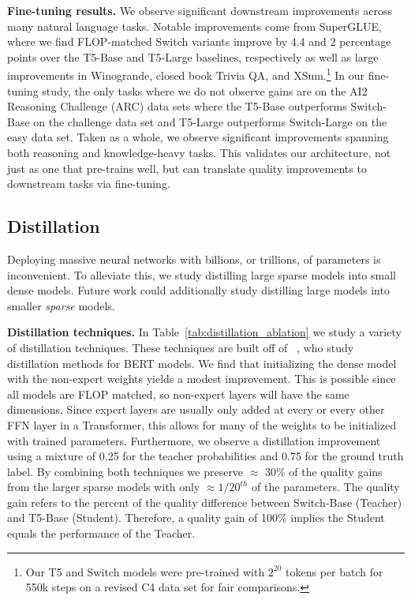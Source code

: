 \documentclass[twoside,11pt]{article}
\begin{document}
\textbf{Fine-tuning results.} We observe significant downstream improvements across many natural language tasks.
Notable improvements come from SuperGLUE, where we find FLOP-matched Switch variants improve by 4.4 and 2 percentage points over the T5-Base and T5-Large baselines, respectively as well as large improvements in Winogrande, closed book Trivia QA, and XSum.\footnote{Our T5 and Switch models were pre-trained with $2^{20}$ tokens per batch for 550k steps on a revised C4 data set for fair comparisons.}
In our fine-tuning study, the only tasks where we do not observe gains are on the AI2 Reasoning Challenge (ARC) data sets where the T5-Base outperforms Switch-Base on the challenge data set and T5-Large outperforms Switch-Large on the easy data set.
Taken as a whole, we observe significant improvements spanning both reasoning and knowledge-heavy tasks.
This validates our architecture, not just as one that pre-trains well, but can translate quality improvements to downstream tasks via fine-tuning.

\subsection{Distillation}
Deploying massive neural networks with billions, or trillions, of parameters is inconvenient.
To alleviate this, we study distilling \citep{hinton2015distilling} large sparse models into small dense models. 
Future work could additionally study distilling large models into smaller \emph{sparse} models.

\textbf{Distillation techniques.}
In Table~\ref{tab:distillation_ablation} we study a variety of distillation techniques.
These techniques are built off of ~\cite{sanh2019distilbert}, who study distillation methods for BERT models.
We find that initializing the dense model with the non-expert weights yields a modest improvement. 
This is possible since all models are FLOP matched, so non-expert layers will have the same dimensions.
Since expert layers are usually only added at every or every other FFN layer in a Transformer, this allows for many of the weights to be initialized with trained parameters.
Furthermore, we observe a distillation improvement using a mixture of 0.25 for the teacher probabilities and 0.75 for the ground truth label.
By combining both techniques we preserve $\approx$ 30\% of the quality gains from the larger sparse models with only $\approx1/20^{th}$ of the parameters. 
The quality gain refers to the percent of the quality difference between Switch-Base (Teacher) and T5-Base (Student). 
Therefore, a quality gain of 100\% implies the Student equals the performance of the Teacher.
\end{document}
